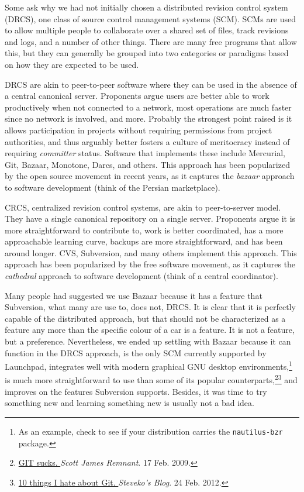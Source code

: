 
Some ask why we had not initially chosen a distributed revision control system (DRCS), one class of source control management systems (SCM). SCMs are used to allow multiple people to collaborate over a shared set of files, track revisions and logs, and a number of other things. There are many free programs that allow this, but they can generally be grouped into two categories or paradigms based on how they are expected to be used.

DRCS are akin to peer-to-peer software where they can be used in the absence of a central canonical server. Proponents argue users are better able to work productively when not connected to a network, most operations are much faster since no network is involved, and more. Probably the strongest point raised is it allows participation in projects without requiring permissions from project authorities, and thus arguably better fosters a culture of meritocracy instead of requiring {\it committer} status. Software that implements these include Mercurial, Git, Bazaar, Monotone, Darcs, and others. This approach has been popularized by the open source movement in recent years, as it captures the {\it bazaar} approach to software development (think of the Persian marketplace).

CRCS, centralized revision control systems, are akin to peer-to-server model. They have a single canonical repository on a single server. Proponents argue it is more straightforward to contribute to, work is better coordinated, has a more approachable learning curve, backups are more straightforward, and has been around longer. CVS, Subversion, and many others implement this approach. This approach has been popularized by the free software movement, as it captures the {\it cathedral} approach to software development (think of a central coordinator).

Many people had suggested we use Bazaar because it has a feature that Subversion, what many are use to, does not, DRCS. It is clear that it is perfectly capable of the distributed approach, but that should not be characterized as a feature any more than the specific colour of a car is a feature. It is not a feature, but a preference. Nevertheless, we ended up settling with Bazaar because it can function in the DRCS approach, is the only SCM currently supported by Launchpad, integrates well with modern graphical GNU desktop environments,\footnote{As an example, check to see if your distribution carries the {\tt nautilus-bzr} package.} is much more straightforward to use than some of its popular counterparts,{\footnote{\href{http://netsplit.com/2009/02/17/git-sucks/}{GIT sucks. }{{\it Scott James Remnant}. 17 Feb. 2009.}}{\footnote{\href{https://steveko.wordpress.com/2012/02/24/10-things-i-hate-about-git/}{10 things I hate about Git. }{\it Steveko's Blog}. 24 Feb. 2012.}}} and improves on the features Subversion supports. Besides, it was time to try something new and learning something new is usually not a bad idea.

